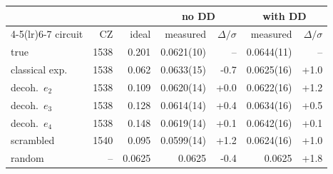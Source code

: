 \begin{tabular}{lrrrrrr}
\toprule
 & & & \multicolumn{2}{c}{no DD} & \multicolumn{2}{c}{with DD} \\
\cmidrule(lr){4-5}\cmidrule(lr){6-7}
circuit & CZ & ideal & measured & $\Delta/\sigma$ & measured & $\Delta/\sigma$ \\
\midrule
true & 1538 & 0.201 & 0.0621(10) & -- & 0.0644(11) & -- \\
classical exp. & 1538 & 0.062 & 0.0633(15) & -0.7 & 0.0625(16) & +1.0 \\
decoh.\ $e_2$ & 1538 & 0.109 & 0.0620(14) & +0.0 & 0.0622(16) & +1.2 \\
decoh.\ $e_3$ & 1538 & 0.128 & 0.0614(14) & +0.4 & 0.0634(16) & +0.5 \\
decoh.\ $e_4$ & 1538 & 0.148 & 0.0619(14) & +0.1 & 0.0642(16) & +0.1 \\
scrambled & 1540 & 0.095 & 0.0599(14) & +1.2 & 0.0624(16) & +1.0 \\
random & -- & 0.0625 & 0.0625 & -0.4 & 0.0625 & +1.8 \\
\bottomrule
\end{tabular}
